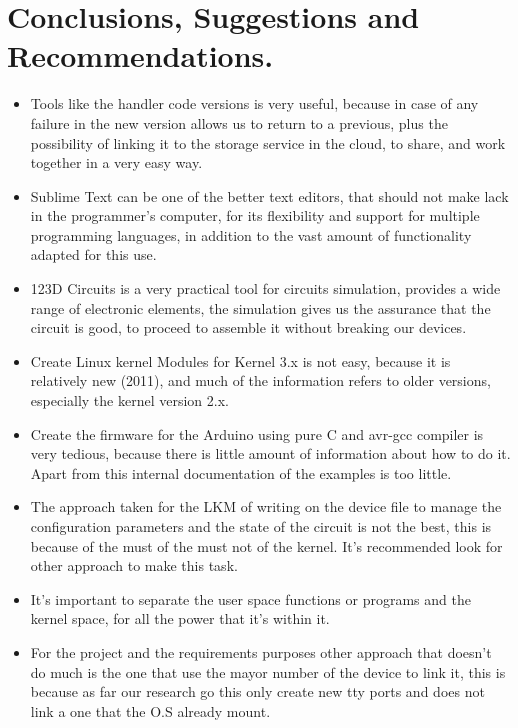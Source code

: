 \documentclass[12pt]{article}
\begin{document}
\section{Conclusions, Suggestions and Recommendations.}
\begin{itemize}
\item Tools like the handler code versions is very useful, because in case of any failure in the new version allows us to return to a previous, plus the possibility of linking it to the storage service in the cloud, to share, and work together in a very easy way.
\item Sublime Text can be one of the better text editors, that should not make lack in the programmer's computer, for its flexibility and support for multiple programming languages, in addition to the vast amount of functionality adapted for this use.
\item 123D Circuits is a very practical tool for circuits simulation, provides a wide range of electronic elements, the simulation gives us the assurance that the circuit is good, to proceed to assemble it without breaking our devices.
\item Create Linux kernel Modules for Kernel 3.x is not easy, because it is relatively new (2011), and much of the information refers to older versions, especially the kernel version 2.x.
\item Create the firmware for the Arduino using pure C and avr-gcc compiler is very tedious, because there is little amount of information about how to do it. Apart from this internal documentation of the examples is too little.
\item The approach taken for the LKM of writing on the device file to manage the configuration parameters and the state of the circuit is not the best, this is because of the must of the must not of the kernel. It's recommended look for other approach to make this task.
\item It's important to separate the user space functions or programs and the kernel space, for all the power that it's within it.
\item For the project and the requirements purposes other approach that doesn't do much is the one that use the mayor number of the device to link it, this is because as far our research go this only create new tty ports and does not link a one that the O.S already mount.

\end{itemize}
\end{document}
